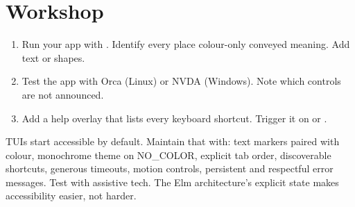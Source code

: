 \section*{Workshop}

\begin{enumerate}[leftmargin=*]
  \item Run your app with . Identify every
    place colour-only conveyed meaning. Add text or shapes.
  \item Test the app with Orca (Linux) or NVDA (Windows).
    Note which controls are not announced.
  \item Add a help overlay that lists every keyboard shortcut.
    Trigger it on  or .
\end{enumerate}

\begin{recap}
TUIs start accessible by default. Maintain that with: text
markers paired with colour, monochrome theme on NO\_COLOR,
explicit tab order, discoverable shortcuts, generous timeouts,
motion controls, persistent and respectful error messages.
Test with assistive tech. The Elm architecture's explicit
state makes accessibility easier, not harder.
\end{recap}
